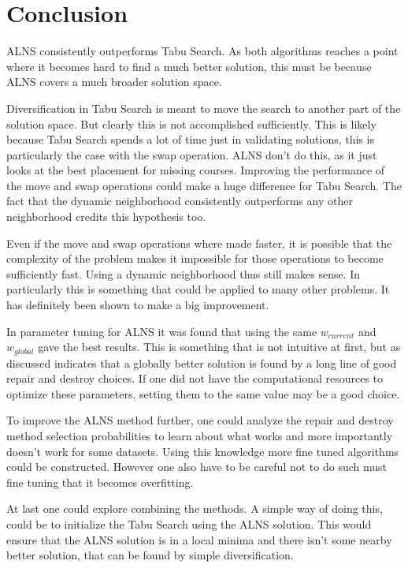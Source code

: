 \section{Conclusion}

ALNS consistently outperforms Tabu Search. As both algorithms reaches a point where it becomes hard to find a much better solution, this must be because ALNS covers a much broader solution space.

Diversification in Tabu Search is meant to move the search to another part of the solution space. But clearly this is not accomplished sufficiently. This is likely because Tabu Search spends a lot of time just in validating solutions, this is particularly the case with the swap operation. ALNS don't do this, as it just looks at the best placement for missing courses. Improving the performance of the move and swap operations could make a huge difference for Tabu Search. The fact that the dynamic neighborhood consistently outperforms any other neighborhood credits this hypothesis too.

Even if the move and swap operations where made faster, it is possible that the complexity of the problem makes it impossible for those operations to become sufficiently fast. Using a dynamic neighborhood thus still makes sense. In particularly this is something that could be applied to many other problems. It has definitely been shown to make a big improvement.

In parameter tuning for ALNS it was found that using the same $w_{current}$ and $w_{global}$ gave the best results. This is something that is not intuitive at first, but as discussed indicates that a globally better solution is found by a long line of good repair and destroy choices. If one did not have the computational resources to optimize these parameters, setting them to the same value may be a good choice.

To improve the ALNS method further, one could analyze the repair and destroy method selection probabilities to learn about what works and more importantly doesn't work for some datasets. Using this knowledge more fine tuned algorithms could be constructed. However one also have to be careful not to do such must fine tuning that it becomes overfitting.

At last one could explore combining the methods. A simple way of doing this, could be to initialize the Tabu Search using the ALNS solution. This would ensure that the ALNS solution is in a local minima and there isn't some nearby better solution, that can be found by simple diversification.
